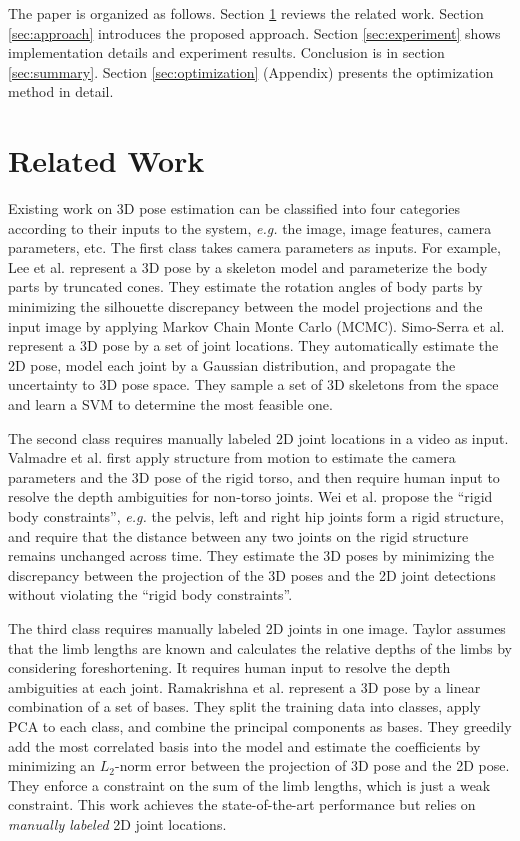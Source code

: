 \documentclass[10pt,twocolumn,letterpaper]{article}
\begin{document}
The paper is organized as follows. Section \ref{sec:relatedwork} reviews the related work. Section \ref{sec:approach} introduces the proposed approach. Section \ref{sec:experiment} shows implementation details and experiment results. Conclusion is in section \ref{sec:summary}. Section \ref{sec:optimization} (Appendix) presents the optimization method in detail.



\section{Related Work}
\label{sec:relatedwork}

Existing work on 3D pose estimation can be classified into four categories according to their inputs to the system, {\it e.g.} the image, image features, camera parameters, etc.
The first class \cite{Lee} \cite{SimoSerraCVPR2012} takes camera parameters as inputs. For example, Lee et al. \cite{Lee}
represent a 3D pose by a skeleton model and parameterize the body
parts by truncated cones. They estimate the rotation angles of body parts by minimizing
the silhouette discrepancy between the model projections and the
input image by applying Markov Chain Monte Carlo
(MCMC). Simo-Serra et al. \cite{SimoSerraCVPR2012} represent
a 3D pose by a set of joint locations. They automatically estimate the 2D pose, model each joint by a Gaussian distribution, and propagate the uncertainty to 3D pose space. They
sample a set of 3D skeletons from the space and learn a SVM to determine the most feasible one.


The second class \cite{c6} \cite{c5} requires manually labeled 2D joint locations in a video as input.
Valmadre et al. \cite{c6} first apply structure from motion to
estimate the camera parameters and the 3D pose of the rigid torso,
and then require human input to resolve the depth ambiguities for
non-torso joints. Wei et al. \cite{c5} propose the ``rigid body
constraints'', {\em e.g.} the pelvis, left and right hip joints form a
rigid structure, and require that the distance between any two joints
on the rigid structure remains unchanged across time. They
estimate the 3D poses by minimizing the discrepancy between the
projection of the 3D poses and the 2D joint detections without violating the
``rigid body constraints''.

The third class \cite{Taylor} \cite{Ramakrishna} requires manually labeled 2D joints in one image. Taylor \cite{Taylor} assumes that the limb lengths are known and calculates the relative depths of the limbs by considering foreshortening. It requires human input to resolve the depth ambiguities at each joint. Ramakrishna et al. \cite{Ramakrishna} represent a 3D pose by a linear combination of a set of bases. They split the
training data into classes, apply PCA to each class, and combine
the principal components as bases. They greedily add the most
correlated basis into the model and estimate the coefficients by
minimizing an $L_2$-norm error between the projection of 3D pose
and the 2D pose. They enforce a constraint on the sum of the limb
lengths, which is just a weak constraint. This work \cite{Ramakrishna} achieves the state-of-the-art performance but relies on \emph{manually labeled} 2D joint
locations.
\end{document}
